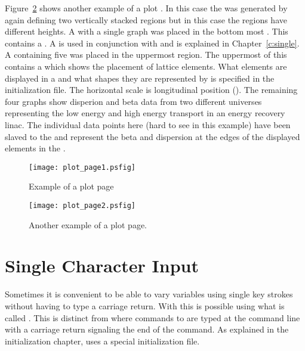 Figure~\ref{f:plot_page2} shows another example of a plot .
In this case the  was generated by again defining two
vertically stacked regions but in this case the regions have different
heights.  A  with a single graph was placed in the
bottom most .  This  contains a .
A  is used in conjunction with  and is
explained in Chapter~\ref{c:single}. A  containing
five  was placed in the uppermost region. The uppermost
 of this  contains a  which
shows the placement of lattice elements.  What elements are displayed
in a  and what shapes they are represented by is
specified in the initialization file. The horizontal scale is
longitudinal position ().  The remaining four graphs show
disperion and beta data from two different universes representing the
low energy and high energy transport in an energy recovery linac. The
individual data points here (hard to see in this example) have been
slaved to the  and represent the beta and dispersion at
the edges of the displayed elements in the .


\begin{figure}
  \centering
  \texttt{[image: plot\_page1.psfig]}
  \caption{Example of a plot page}
  \label{f:plot_page1}
\end{figure}

\begin{figure}
  \centering
  \texttt{[image: plot\_page2.psfig]}
  \caption{Another example of a plot page.}
  \label{f:plot_page2}
\end{figure}

\vfill
\break
\section{Single Character Input}

Sometimes it is convenient to be able to vary variables using single
key strokes without having to type a carriage return.  With \tao this
is possible using what is called . This is distinct
from  where commands to \tao are typed at the command
line with a carriage return signaling the end of the command. As
explained in the initialization chapter,  uses a
special initialization file.

